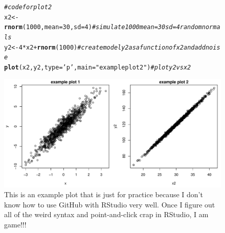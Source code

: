 \documentclass[10pt,letterpaper]{article}\usepackage[]{graphicx}\usepackage[]{color}
\makeatletter
\newcommand{\hlnum}[1]{\textcolor[rgb]{0.686,0.059,0.569}{#1}}%
\newcommand{\hlstr}[1]{\textcolor[rgb]{0.192,0.494,0.8}{#1}}%
\newcommand{\hlcom}[1]{\textcolor[rgb]{0.678,0.584,0.686}{\textit{#1}}}%
\newcommand{\hlopt}[1]{\textcolor[rgb]{0,0,0}{#1}}%
\newcommand{\hlstd}[1]{\textcolor[rgb]{0.345,0.345,0.345}{#1}}%
\newcommand{\hlkwb}[1]{\textcolor[rgb]{0.69,0.353,0.396}{#1}}%
\newcommand{\hlkwc}[1]{\textcolor[rgb]{0.333,0.667,0.333}{#1}}%
\newcommand{\hlkwd}[1]{\textcolor[rgb]{0.737,0.353,0.396}{\textbf{#1}}}%
\newenvironment{kframe}{%
 \def\at@end@of@kframe{}%
 \ifinner\ifhmode%
  \def\at@end@of@kframe{\end{minipage}}%
  \begin{minipage}{\columnwidth}%
 \fi\fi%
 \def\FrameCommand##1{\hskip\@totalleftmargin \hskip-\fboxsep
 \colorbox{shadecolor}{##1}\hskip-\fboxsep
     \hskip-\linewidth \hskip-\@totalleftmargin \hskip\columnwidth}%
 \MakeFramed {\advance\hsize-\width
   \@totalleftmargin\z@ \linewidth\hsize
   \@setminipage}}%
 {\par\unskip\endMakeFramed%
 \at@end@of@kframe}
\newenvironment{knitrout}{}{} %
\makeatother
\begin{document}
\begin{figure}[h!]
\begin{tcolorbox}
\begin{knitrout}
\begin{kframe}
\begin{alltt}
\hlcom{# code for plot 2}
\hlstd{x2} \hlkwb{<-} \hlkwd{rnorm}\hlstd{(}\hlnum{1000}\hlstd{,}\hlkwc{mean}\hlstd{=}\hlnum{30}\hlstd{,}\hlkwc{sd}\hlstd{=}\hlnum{4}\hlstd{)} \hlcom{# simulate 1000 mean=30 sd=4 random normals}
\hlstd{y2} \hlkwb{<-} \hlnum{4}\hlopt{*}\hlstd{x2} \hlopt{+} \hlkwd{rnorm}\hlstd{(}\hlnum{1000}\hlstd{)}       \hlcom{# create model y2 as a function of x2 and add noise}
\hlkwd{plot}\hlstd{(x2,y2,}\hlkwc{type}\hlstd{=}\hlstr{'p'}\hlstd{,}\hlkwc{main}\hlstd{=}\hlstr{"example plot 2"}\hlstd{)} \hlcom{# plot y2 vs x2}
\end{alltt}
\end{kframe}
\end{knitrout}
\includegraphics[width=\textwidth]{example_plot.pdf}
\caption{This is an example plot that is just for practice because I don't know how to use GitHub with RStudio very well. Once I figure out all of the weird syntax and point-and-click crap in RStudio, I am game!!!}
\end{tcolorbox}
\end{figure}
\end{document}
